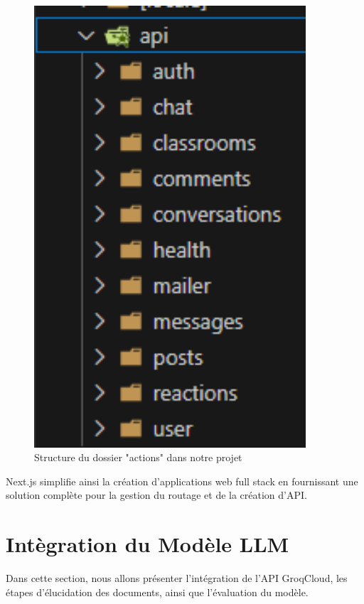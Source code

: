 \begin{figure}[H]
\begin{minipage}[b]{0.45\textwidth}
        \includegraphics[width=0.9\textwidth,height=0.9\textwidth]{images/chp5/fig2.png}
        \caption{Structure du dossier "actions" dans notre projet}
        \label{fig:Structure du dossier "actions" dans notre projet}
    \end{minipage}
\end{figure}


\noindent Next.js simplifie ainsi la création d'applications web full stack en fournissant une solution complète pour la gestion du routage et de la création d'API.


\section{Intègration du Modèle LLM}
Dans cette section, nous allons présenter l'intégration de l'API GroqCloud, les étapes d'élucidation des documents, ainsi que l'évaluation du modèle.
